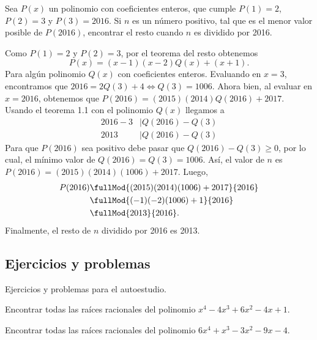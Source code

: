 \begin{example}
    Sea $P(x)$ un polinomio con coeficientes enteros, que cumple $P(1) = 2$, $P(2) = 3$ y $P(3) = 2016$.
    Si $n$ es un número positivo, tal que es el menor valor posible de $P(2016)$, encontrar el resto cuando $n$ es dividido por 2016.
\end{example}
\begin{solution}
    Como $P(1) = 2$ y $P(2) = 3$, por el teorema del resto obtenemos
    \[
        P(x) = (x - 1)(x - 2)Q(x) + (x + 1).
    \]
    Para algún polinomio $Q(x)$ con coeficientes enteros.
    Evaluando en $x = 3$, encontramos que $2016 = 2Q(3) + 4 \iff Q(3) = 1006$.
    Ahora bien, al evaluar en $x = 2016$, obtenemos que $P(2016) = (2015)(2014)Q(2016) + 2017$.
    Usando el teorema 1.1 con el polinomio $Q(x)$ llegamos a
    \begin{align*}
        2016 - 3 &\mid Q(2016) - Q(3)\\
        2013 &\mid Q(2016) - Q(3)
    \end{align*}
    Para que $P(2016)$ sea positivo debe pasar que $Q(2016) - Q(3) \geq 0$, por lo cual, el mínimo valor de $Q(2016) = Q(3) = 1006$.
    Así, el valor de $n$ es $P(2016) = (2015)(2014)(1006) + 2017$.
    Luego,
    \begin{align*}
        P(2016) &\fullMod{(2015)(2014)(1006) + 2017}{2016}\\
         &\fullMod{(-1)(-2)(1006) + 1}{2016}\\
         &\fullMod{2013}{2016}.
    \end{align*}
    Finalmente, el resto de $n$ dividido por 2016 es 2013.
\end{solution}



\subsection{Ejercicios y problemas}

Ejercicios y problemas para el autoestudio.

    \begin{problem}
        Encontrar todas las raíces racionales del polinomio $x^4 - 4x^3 + 6x^2 - 4x + 1$.
    \end{problem}

    \begin{problem}
        Encontrar todas las raíces racionales del polinomio $6x^4 + x^3 - 3x^2 - 9x - 4$.
    \end{problem}

